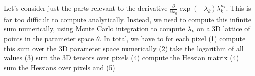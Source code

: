 \documentclass{article}
\begin{document}
Let's consider just the parts relevant to the derivative $\frac{\partial}{\partial x_{0}}\exp\left(-\lambda_{k}\right)\lambda_{k}^{n_{k}}$. This is far too difficult to compute analytically. Instead, we need to compute this infinite sum numerically, using Monte Carlo integration to compute $\lambda_{k}$ on a 3D lattice of points in the parameter space $\theta$. In total, we have to for each pixel (1) compute this sum over the 3D parameter space numerically (2) take the logarithm of all values (3) sum the 3D tensors over pixels (4) compute the Hessian matrix (4) sum the Hessians over pixels and (5) 
\end{document}
